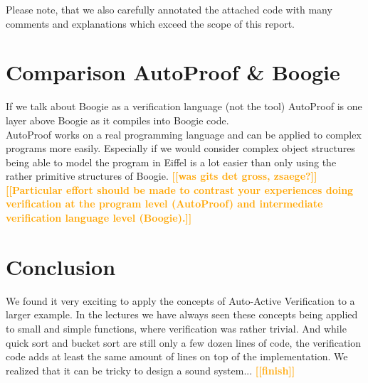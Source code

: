 \documentclass{report}
\newcommand{\todo}[1]{\textsf{\textbf{\textcolor{orange}{[[#1]]}}}}
\begin{document}
Please note, that we also carefully annotated the attached code with many comments and explanations which exceed the scope of this report.

\section{Comparison AutoProof \& Boogie}
\label{s:comparison}
If we talk about Boogie as a verification language (not the tool) AutoProof is one layer above Boogie as it compiles into Boogie code.
\\
AutoProof works on a real programming language and can be applied to complex programs more easily. Especially if we would consider complex object structures being able to model the program in Eiffel is a lot easier than only using the rather primitive structures of Boogie.
\todo{was gits det gross, zsaege?}
\\
\todo{Particular effort should be made to contrast your experiences doing verification at the
program level (AutoProof) and intermediate verification language level (Boogie).}

\section{Conclusion}
\label{s:conclusion}
We found it very exciting to apply the concepts of Auto-Active Verification to a larger example. In the lectures we have always seen these concepts being applied to small and simple functions, where verification was rather trivial. And while quick sort and bucket sort are still only a few dozen lines of code, the verification code adds at least the same amount of lines on top of the implementation.
We realized that it can be tricky to design a sound system...
\todo{finish}





\end{document}
